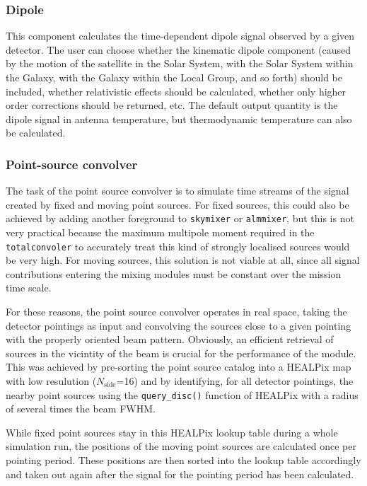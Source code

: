 \documentclass{aa}
\begin{document}
\subsubsection {Dipole}
\label{dipole}

This component calculates the time-dependent dipole signal observed by
a given detector. The user can choose whether the kinematic dipole
component (caused by the motion of the satellite in the Solar System,
with the Solar System within the Galaxy, with the Galaxy within the
Local Group, and so forth) should be included, whether relativistic
effects should be calculated, whether only higher order corrections
should be returned, etc. The default output quantity is the dipole
signal in antenna temperature, but thermodynamic temperature can also
be calculated.

\subsubsection {Point-source convolver}
\label{pointsources}

The task of the point source convolver is to simulate time streams of the
signal created by fixed and moving point sources. For fixed sources, this
could also be achieved by adding another foreground to
{\tt skymixer} or {\tt almmixer}, but this is not very practical because
the maximum multipole moment required in the {\tt totalconvoler} to accurately
treat this kind of strongly localised sources would be very high.
For moving sources, this solution is not viable at all, since all signal
contributions entering the mixing modules must be constant over the mission
time scale.

For these reasons, the point source convolver operates in real space, taking
the detector pointings as input and convolving the sources close to a given
pointing with the properly oriented beam pattern. Obviously, an efficient
retrieval of sources in the vicintity of the beam is crucial for the
performance of the module. This was achieved by pre-sorting the point source
catalog into a HEALPix map with low resulution ($N_{\text{side}}$=16) and
by identifying, for all detector pointings, the nearby point sources using
the {\tt query\_disc()} function of HEALPix with a radius of several times
the beam FWHM.

While fixed point sources stay in this HEALPix lookup table during a whole
simulation run, the positions of the moving point sources are calculated once
per pointing period. These positions are then sorted into the lookup table
accordingly and taken out again after the signal for the pointing period has
been calculated.
\end{document}
